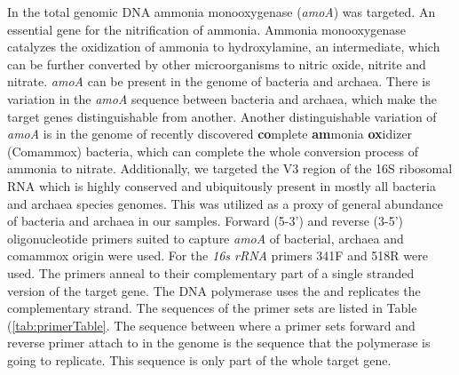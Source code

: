 \documentclass[twoside,12pt,final]{ucthesis-CA2012}
\begin{document}
\begin{ucmainmatter}
In the total genomic DNA ammonia monooxygenase (\emph{amoA}) was targeted. An essential gene for the nitrification of ammonia. Ammonia monooxygenase catalyzes the oxidization of ammonia to hydroxylamine, an intermediate, which can be further converted by other microorganisms to nitric oxide, nitrite and nitrate. \emph{amoA} can be present in the genome of bacteria and archaea. There is variation in the \emph{amoA} sequence between bacteria and archaea, which make the target genes distinguishable from another. Another distinguishable variation of \emph{amoA} is in the genome of recently discovered \textbf{co}mplete \textbf{am}monia \textbf{ox}idizer (Comammox) bacteria, which can complete the whole conversion process of ammonia to nitrate. Additionally, we targeted the V3 region of the 16S ribosomal RNA which is highly conserved and ubiquitously present in mostly all bacteria and archaea species genomes. This was utilized as a proxy of general abundance of bacteria and archaea in our samples.
Forward (5-3') and reverse (3-5') oligonucleotide primers suited to capture \emph{amoA} of bacterial, archaea and comammox origin were used. For the \emph{16s rRNA} primers 341F and 518R were used. The primers anneal to their complementary part of a single stranded version of the target gene. The DNA polymerase uses the and replicates the complementary strand. The sequences of the primer sets are listed in Table (\ref{tab:primerTable}. The sequence between where a primer sets forward and reverse primer attach to in the genome is the sequence that the polymerase is going to replicate. This sequence is only part of the whole target gene.
\begin{table}


\end{table}
\end{ucmainmatter}
\end{document}
